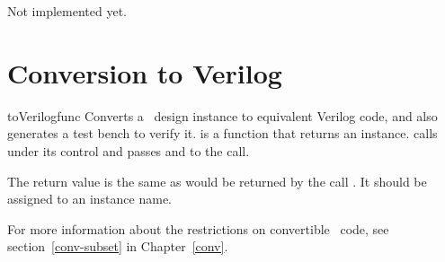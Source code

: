 Not implemented yet.

\section{Conversion to Verilog\label{ref-conv}}

\begin{funcdesc}{toVerilog}{func  }
Converts a \myhdl\ design instance to equivalent Verilog
code, and also generates a test bench to verify it.
 is a function that returns an instance.
 calls  under its control
and passes  and  to the call.

The return value is the same as would be returned by the call
. It should be assigned
to an instance name.

For more information about the restrictions on convertible
\myhdl\ code, see section~\ref{conv-subset} in
Chapter~\ref{conv}.
\end{funcdesc}

